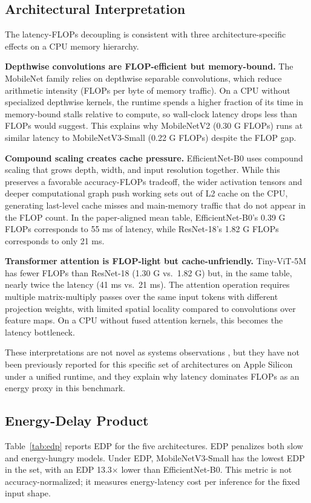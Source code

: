 \documentclass{svproc}
\begin{document}
\subsection{Architectural Interpretation}
The latency-FLOPs decoupling is consistent with three architecture-specific
effects on a CPU memory hierarchy.

\textbf{Depthwise convolutions are FLOP-efficient but memory-bound.} The
MobileNet family relies on depthwise separable convolutions, which reduce
arithmetic intensity (FLOPs per byte of memory traffic). On a CPU without
specialized depthwise kernels, the runtime spends a higher fraction of its
time in memory-bound stalls relative to compute, so wall-clock latency drops
less than FLOPs would suggest. This explains why MobileNetV2 (0.30 G FLOPs)
runs at similar latency to MobileNetV3-Small (0.22 G FLOPs) despite the FLOP
gap.

\textbf{Compound scaling creates cache pressure.} EfficientNet-B0 uses
compound scaling that grows depth, width, and input resolution together. While
this preserves a favorable accuracy-FLOPs tradeoff, the wider activation
tensors and deeper computational graph push working sets out of L2 cache on
the CPU, generating last-level cache misses and main-memory traffic that do
not appear in the FLOP count. In the paper-aligned mean table,
EfficientNet-B0's 0.39 G FLOPs corresponds to
55 ms of latency, while ResNet-18's 1.82 G FLOPs corresponds to only 21 ms.

\textbf{Transformer attention is FLOP-light but cache-unfriendly.} Tiny-ViT-5M
has fewer FLOPs than ResNet-18 (1.30 G vs.\ 1.82 G) but, in the same table,
nearly twice the
latency (41 ms vs.\ 21 ms). The attention operation requires multiple
matrix-multiply passes over the same input tokens with different projection
weights, with limited spatial locality compared to convolutions over feature
maps. On a CPU without fused attention kernels, this becomes the latency
bottleneck.

These interpretations are not novel as systems observations
\cite{eyeriss2017,hardwareaware2019}, but they have not been previously
reported for this specific set of architectures on Apple Silicon under a
unified runtime, and they explain why latency dominates FLOPs as an energy
proxy in this benchmark.

\subsection{Energy-Delay Product}
Table~\ref{tab:edp} reports EDP for the five architectures. EDP penalizes
both slow and energy-hungry models. Under EDP, MobileNetV3-Small has the
lowest EDP in the set, with an EDP 13.3$\times$ lower than
EfficientNet-B0. This metric is not accuracy-normalized; it measures
energy-latency cost per inference for the fixed input shape.
\end{document}
